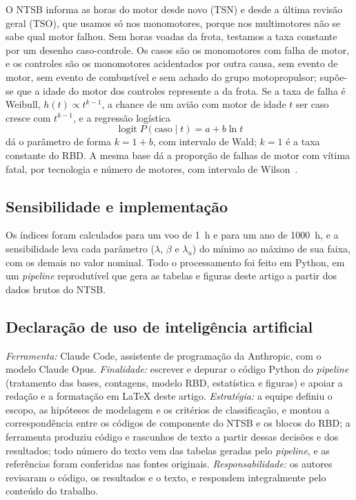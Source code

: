 O NTSB informa as horas do motor desde novo (TSN) e desde a última revisão geral (TSO), que usamos só nos monomotores, porque nos multimotores não se sabe qual motor falhou.
Sem horas voadas da frota, testamos a taxa constante por um desenho caso-controle.
Os casos são os monomotores com falha de motor, e os controles são os monomotores acidentados por outra causa, sem evento de motor, sem evento de combustível e sem achado do grupo motopropulsor; supõe-se que a idade do motor dos controles represente a da frota.
Se a taxa de falha é Weibull, $h(t)\propto t^{k-1}$, a chance de um avião com motor de idade $t$ ser caso cresce com $t^{k-1}$, e a regressão logística
\begin{equation}
  \operatorname{logit} P(\text{caso}\mid t) = a + b\ln t
  \label{eq:caso}
\end{equation}
dá o parâmetro de forma $k=1+b$, com intervalo de Wald; $k=1$ é a taxa constante do RBD.
A mesma base dá a proporção de falhas de motor com vítima fatal, por tecnologia e número de motores, com intervalo de Wilson~\cite{wilson1927}.

\subsection{Sensibilidade e implementação}\label{sec:sensib}

Os índices foram calculados para um voo de 1~h e para um ano de 1000~h, e a sensibilidade leva cada parâmetro ($\lambda$, $\beta$ e $\lambda_u$) do mínimo ao máximo de sua faixa, com os demais no valor nominal.
Todo o processamento foi feito em Python, em um \emph{pipeline} reprodutível que gera as tabelas e figuras deste artigo a partir dos dados brutos do NTSB.

\subsection{Declaração de uso de inteligência artificial}\label{sec:ia}

\emph{Ferramenta:} Claude Code, assistente de programação da Anthropic, com o modelo Claude Opus.
\emph{Finalidade:} escrever e depurar o código Python do \emph{pipeline} (tratamento das bases, contagens, modelo RBD, estatística e figuras) e apoiar a redação e a formatação em \LaTeX{} deste artigo.
\emph{Estratégia:} a equipe definiu o escopo, as hipóteses de modelagem e os critérios de classificação, e montou a correspondência entre os códigos de componente do NTSB e os blocos do RBD; a ferramenta produziu código e rascunhos de texto a partir dessas decisões e dos resultados; todo número do texto vem das tabelas geradas pelo \emph{pipeline}, e as referências foram conferidas nas fontes originais.
\emph{Responsabilidade:} os autores revisaram o código, os resultados e o texto, e respondem integralmente pelo conteúdo do trabalho.
